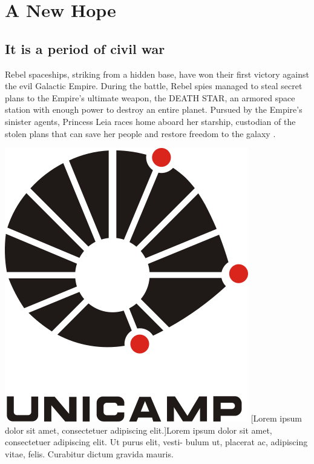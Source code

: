\chapter{A New Hope}
\section{It is a period of civil war}
Rebel spaceships, striking from a hidden base, have won 
their first victory against the evil Galactic Empire.  
During the battle, Rebel spies managed to steal secret 
plans to the Empire's ultimate weapon, the DEATH STAR, 
an armored space station with enough power to destroy 
an entire planet. Pursued by the Empire's sinister 
agents, Princess Leia races home aboard her starship, 
custodian of the stolen plans that can save her people 
and restore freedom to the galaxy \cite{bib_skywalker77, bib_vader77, bib_kenobi77}.

\lipsum[1-3]

\begin{center}
\includegraphics[width=.35\textwidth]{Images/unicamp.png}
[Lorem ipsum dolor sit amet, consectetuer adipiscing elit.]{Lorem ipsum dolor sit amet, consectetuer adipiscing elit. Ut purus elit, vesti- bulum ut, placerat ac, adipiscing vitae, felis. Curabitur dictum gravida mauris.}
\end{center}

\lipsum[4-10]
